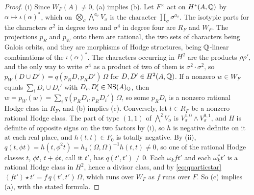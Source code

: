 \begin{proof}
(i) Since $W_{F}(A)\ne0$, (a) implies (b). Let $F^{\times}$ act on $H^{*}(A,\mathbb{Q})$ by
$\alpha\mapsto\iota(\alpha)^{*}$, which on
$\bigotimes_{\sigma}\bigwedge^{a_{\sigma}}V_{\sigma}$ is the character
$\prod_{\sigma}\sigma^{a_{\sigma}}$. The isotypic parts for the characters
$\sigma^{2}$ in degree two and $\sigma^{4}$ in degree four are $R_{F}$ and
$W_{F}$. The projections $p_{R}$ and $p_{W}$ onto them are rational, the two
sets of characters being Galois orbits, and they are morphisms of Hodge
structures, being $\mathbb{Q}$-linear combinations of the $\iota(\alpha)^{*}$. The
characters occurring in $H^{2}$ are the products $\rho\rho'$, and the only way
to write $\sigma^{4}$ as a product of two of them is $\sigma^{2}\cdot\sigma^{2}$,
so $p_{W}(D\cup D')=q(p_{R}D,p_{R}D')\,\Omega$ for $D,D'\in H^{2}(A,\mathbb{Q})$. If a
nonzero $w\in W_{F}$ equals $\sum_{i}D_{i}\cup D_{i}'$ with
$D_{i},D_{i}'\in\mathrm{NS}(A)_{\mathbb{Q}}$, then
$w=p_{W}(w)=\sum_{i}q(p_{R}D_{i},p_{R}D_{i}')\,\Omega$, so some $p_{R}D_{i}$ is
a nonzero rational Hodge class in $R_{F}$, and (b) implies (c). Conversely,
let $t\in R_{F}$ be a nonzero rational Hodge class. The part of type $(1,1)$
of $\bigwedge^{2}V_{\sigma}$ is $V_{\sigma}^{1,0}\wedge V_{\sigma}^{0,1}$, and
$H$ is definite of opposite signs on the two factors by (i),
so $h$ is negative definite on it at each real place, and $h(t,t)\in F_{0}$ is
totally negative. By (ii),
$q(t,\phi t)=h(t,\phi^{2}t)=h_{4}(\Omega,\Omega)^{-1}h(t,t)\ne0$, so one of the
rational Hodge classes $t$, $\phi t$, $t+\phi t$, call it $t'$, has
$q(t',t')\ne0$. Each $\omega_{k}ft'$ and each $\omega_{k}^{*}t'$ is a rational
Hodge class in $H^{2}$, hence a divisor class, and by \eqref{eq:quarticstar}
$(ft')\star t'=f\,q(t',t')\,\Omega$, which runs over $W_{F}$ as $f$ runs over
$F$. So (c) implies (a), with the stated formula.


\end{proof}
